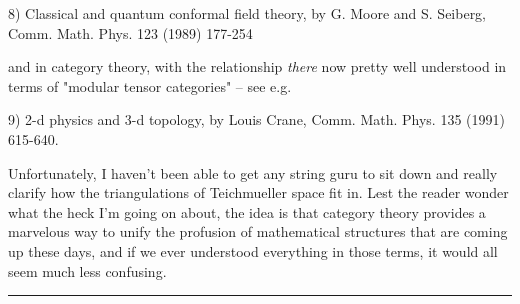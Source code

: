 8) Classical and quantum conformal field theory, by G. Moore and S.
Seiberg, Comm. Math. Phys. 123 (1989) 177-254

and in category theory, with the relationship \emph{there} now pretty well
understood in terms of "modular tensor categories"  -- see e.g. 

9) 2-d physics and 3-d topology, by Louis Crane, Comm. Math. Phys. 135
(1991) 615-640.  

Unfortunately, I haven't been able to get any string guru to sit down 
and really clarify how the triangulations of Teichmueller space fit in.
Lest the reader wonder what the heck I'm going on about, the idea is
that category theory provides a marvelous way to unify the profusion of
mathematical structures that are coming up these days, and if we ever
understood everything in those terms, it would all seem much less
confusing.  
\par\noindent\rule{\textwidth}{0.4pt}

